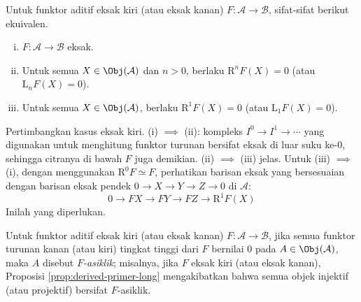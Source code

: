 \begin{korolari}\label{prop:obstruction-exactness}
	Untuk funktor aditif eksak kiri (atau eksak kanan) $F: \mathcal{A} \to \mathcal{B}$, sifat-sifat berikut ekuivalen.
	\begin{enumerate}[(i)]
		\item $F: \mathcal{A} \to \mathcal{B}$ eksak.
		\item Untuk semua $X \in \Obj(\mathcal{A})$ dan $n > 0$, berlaku $\mathrm{R}^n F(X) = 0$ (atau $\mathrm{L}_n F(X) = 0$).
		\item Untuk semua $X \in \Obj(\mathcal{A})$, berlaku $\mathrm{R}^1 F(X) = 0$ (atau $\mathrm{L}_1 F(X) = 0$).
	\end{enumerate}
\end{korolari}
\begin{bukti}
	Pertimbangkan kasus eksak kiri. (i) $\implies$ (ii): kompleks $I^0 \to I^1 \to \cdots$ yang digunakan untuk menghitung funktor turunan bersifat eksak di luar suku ke-$0$, sehingga citranya di bawah $F$ juga demikian. (ii) $\implies$ (iii) jelas. Untuk (iii) $\implies$ (i), dengan menggunakan $\mathrm{R}^0 F \simeq F$, perhatikan barisan eksak yang bersesuaian dengan barisan eksak pendek $0 \to X \to Y \to Z \to 0$ di $\mathcal{A}$:
	\[ 0 \to FX \to FY \to FZ \to \mathrm{R}^1 F(X) \]
	Inilah yang diperlukan.
\end{bukti}

\begin{konvensi}\label{con:F-acyclic}
	Untuk funktor aditif eksak kiri (atau eksak kanan) $F: \mathcal{A} \to \mathcal{B}$, jika semua funktor turunan kanan (atau kiri) tingkat tinggi dari $F$ bernilai $0$ pada $A \in \Obj(\mathcal{A})$, maka $A$ disebut \emph{$F$-asiklik}; misalnya, jika $F$ eksak kiri (atau eksak kanan), Proposisi \ref{prop:derived-primer-long} mengakibatkan bahwa semua objek injektif (atau projektif) bersifat $F$-asiklik.
\end{konvensi}

